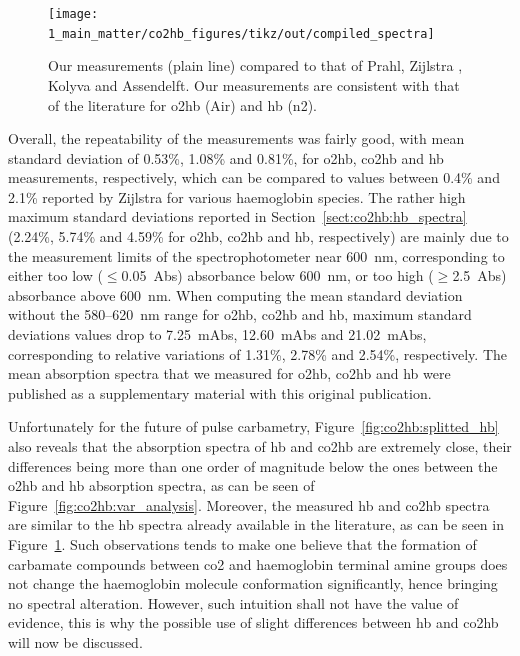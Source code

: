 \begin{figure}
	\centering
	\texttt{[image: 1\_main\_matter/co2hb\_figures/tikz/out/compiled\_spectra]}
	\caption[Obtained haemoglobin spectra: comparison with the literature.]{Our measurements (plain line) compared to that of Prahl\cite{prahl1998}, Zijlstra \etal\cite{zijlstra2000}, Kolyva \etal\cite{kolyva2012} and Assendelft\cite{assendelft1970}. Our measurements are consistent with that of the literature for \gls{o2hb} (Air) and \gls{hb} (\gls{n2}).}
	\label{fig:co2hb:compiled_spectra}
\end{figure}

Overall, the repeatability of the measurements was fairly good, with mean standard deviation of 0.53\%, 1.08\% and 0.81\%, for \gls{o2hb}, \gls{co2hb} and \gls{hb} measurements, respectively, which can be compared to values between 0.4\% and 2.1\% reported by Zijlstra \etal{} for various haemoglobin species\cite[Table~8.3]{zijlstra2000}. The rather high maximum standard deviations reported in Section~\ref{sect:co2hb:hb_spectra} (2.24\%, 5.74\% and 4.59\% for \gls{o2hb}, \gls{co2hb} and \gls{hb}, respectively) are mainly due to the measurement limits of the spectrophotometer near 600~nm, corresponding to either too low ($\leq$0.05~Abs) absorbance below 600~nm, or too high ($\geq$2.5~Abs) absorbance above 600~nm. When computing the mean standard deviation without the 580--620~nm range for \gls{o2hb}, \gls{co2hb} and \gls{hb}, maximum standard deviations values drop to 7.25~mAbs, 12.60~mAbs and 21.02~mAbs, corresponding to relative variations of 1.31\%, 2.78\% and 2.54\%, respectively. The mean absorption spectra that we measured for {\gls{o2hb}}, {\gls{co2hb}} and {\gls{hb}} were published as a supplementary material with this original publication\cite{dervieux2020}.

Unfortunately for the future of pulse carbametry, Figure~\ref{fig:co2hb:splitted_hb} also reveals that the absorption spectra of \gls{hb} and \gls{co2hb} are extremely close, their differences being more than one order of magnitude below the ones between the \gls{o2hb} and \gls{hb} absorption spectra, as can be seen of Figure~\ref{fig:co2hb:var_analysis}. Moreover, the measured \gls{hb} and \gls{co2hb} spectra are similar to the \gls{hb} spectra already available in the literature, as can be seen in Figure~\ref{fig:co2hb:compiled_spectra}. Such observations tends to make one believe that the formation of carbamate compounds between \gls{co2} and haemoglobin terminal amine groups does not change the haemoglobin molecule conformation significantly, hence bringing no spectral alteration. However, such intuition shall not have the value of evidence, this is why the possible use of slight differences between \gls{hb} and \gls{co2hb} will now be discussed.

